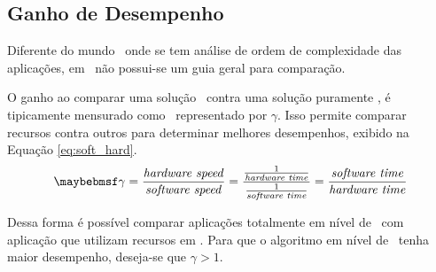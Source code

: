         \subsection{Ganho de Desempenho}
        
        Diferente do mundo \software\ onde se tem análise de ordem de complexidade das aplicações, em \hardware\ não possui-se um guia geral para comparação.
        
        
        O ganho ao comparar uma solução \hs\ contra uma solução puramente \software, é tipicamente mensurado como \speedup\ representado por $ \gamma $.
        Isso permite comparar recursos contra outros para determinar melhores desempenhos, exibido na Equação \ref{eq:soft_hard}.
        \begin{equation}
             \gamma =
             \frac{
                \text{\textit{hardware speed}}
             }{
                \text{\textit{software speed}}
             }
             =
             \frac{
                \frac{
                   1
                } {
                   \text{\textit{hardware time}}
                }
             } {
                \frac{
                   1
                }{
                   \text{\textit{software time}}
                }
             }
             =
             \frac{
                \text{\textit{software time}}
             } {
                \text{\textit{hardware time}} \label{eq:soft_hard}
             }
        \end{equation}
        
        Dessa forma é possível comparar aplicações totalmente em nível de \software\ com aplicação que utilizam recursos em \hardware.
        Para que o algoritmo em nível de \hardware\ tenha maior desempenho, deseja-se que $ \gamma > 1 $.
        
